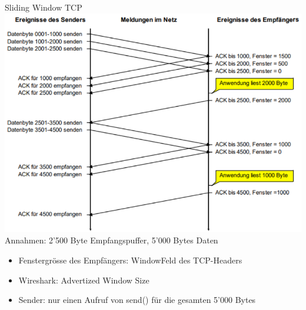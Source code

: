 \begin{example} Sliding Window TCP\\
        \includegraphics[width=1\linewidth]{images/flusssteuerung_tcp.png}\\
    Annahmen: 2'500 Byte Empfangspuffer, 5'000 Bytes Daten
    \begin{itemize}
        \item Fenstergrösse des Empfängers: WindowFeld des TCP-Headers
        \item Wireshark: Advertized Window Size
        \item Sender: nur einen Aufruf von send() für die gesamten 5'000 Bytes
    \end{itemize}
\end{example}

